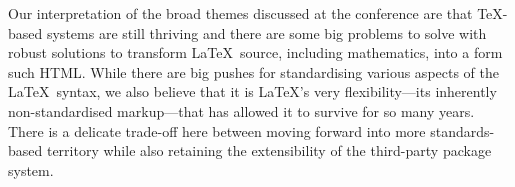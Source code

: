 \documentclass{ltnews}
\begin{document}
Our interpretation of the broad themes discussed at the conference are that
\TeX-based systems are still thriving and there are some big problems to solve
with robust solutions to transform \LaTeX\ source, including mathematics, into
a form such HTML. While there are big pushes for standardising various aspects
of the \LaTeX\ syntax, we also believe that it is \LaTeX's very
flexibility---its inherently non-standardised markup---that has allowed it to
survive for so many years. There is a delicate trade-off here between moving
forward into more standards-based territory while also retaining the
extensibility of the third-party package system.
\end{document}
